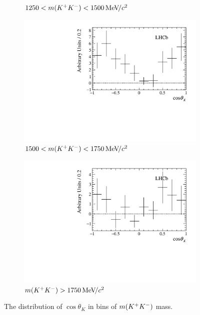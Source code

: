 \begin{figure}[!h]
\begin{subfigure}[t]{0.49\textwidth}
        \caption{$1250<m({{K}^+}{{K}^-})<1500{\mathrm{\,Me\kern -0.1em V\!/}c^2}$}
    \end{subfigure}
    \begin{subfigure}[t]{0.49\textwidth}
        \includegraphics[width=1.0\textwidth]{figs/B2DsKK/helAngle_bin3_sweighted.pdf}
        \caption{$1500<m({{K}^+}{{K}^-})<1750{\mathrm{\,Me\kern -0.1em V\!/}c^2}$}
    \end{subfigure}
    \begin{subfigure}[t]{0.49\textwidth}
        \includegraphics[width=1.0\textwidth]{figs/B2DsKK/helAngle_bin4_sweighted.pdf}
        \caption{$m({{K}^+}{{K}^-})>1750{\mathrm{\,Me\kern -0.1em V\!/}c^2}$}
    \end{subfigure}
    \caption{The distribution of $\cos{\theta_{K}}$ in bins of $m({{K}^+}{{K}^-})$ mass.}
    \label{fig:B2DsKK_helicty_angle_bins}
\end{figure}


